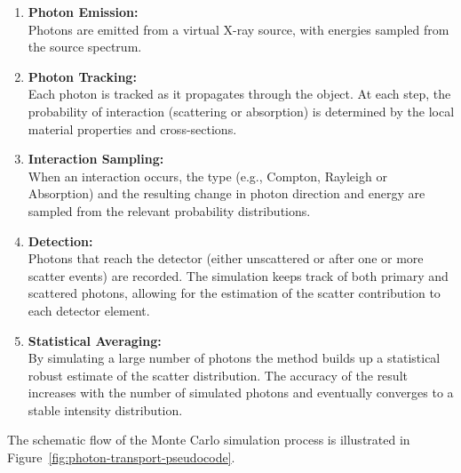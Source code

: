\begin{enumerate}
    \item \textbf{Photon Emission:} \\
        Photons are emitted from a virtual X-ray source, with energies sampled
        from the source spectrum.
    \item \textbf{Photon Tracking:} \\
        Each photon is tracked as it propagates through the object. At each
        step, the probability of interaction (scattering or absorption) is
        determined by the local material properties and cross-sections.
    \item \textbf{Interaction Sampling:} \\
        When an interaction occurs, the type (e.g., Compton, Rayleigh or
        Absorption) and the resulting change in photon direction and energy are
        sampled from the relevant probability distributions.
    \item \textbf{Detection:} \\
        Photons that reach the detector (either unscattered or after one or more
        scatter events) are recorded. The simulation keeps track of both primary
        and scattered photons, allowing for the estimation of the scatter
        contribution to each detector element.
    \item \textbf{Statistical Averaging:} \\
        By simulating a large number of photons the method builds up a
        statistical robust estimate of the scatter distribution. The accuracy of
        the result increases with the number of simulated photons and eventually
        converges to a stable intensity distribution.
\end{enumerate}

The schematic flow of the Monte Carlo simulation process is illustrated in
Figure~\ref{fig:photon-transport-pseudocode}.

